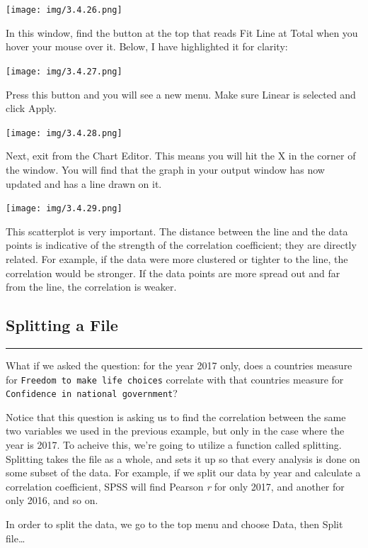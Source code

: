 \documentclass[]{book}
\begin{document}
\texttt{[image: img/3.4.26.png]}

In this window, find the button at the top that reads {Fit Line at
Total} when you hover your mouse over it. Below, I have highlighted it
for clarity:

\texttt{[image: img/3.4.27.png]}

Press this button and you will see a new menu. Make sure {Linear} is
selected and click {Apply}.

\texttt{[image: img/3.4.28.png]}

Next, exit from the Chart Editor. This means you will hit the {X} in the
corner of the window. You will find that the graph in your output window
has now updated and has a line drawn on it.

\texttt{[image: img/3.4.29.png]}

This scatterplot is very important. The distance between the line and
the data points is indicative of the strength of the correlation
coefficient; they are directly related. For example, if the data were
more clustered or tighter to the line, the correlation would be
stronger. If the data points are more spread out and far from the line,
the correlation is weaker.

\subsection{Splitting a File}\label{splitting-a-file}

\begin{center}\rule{0.5\linewidth}{0.5pt}\end{center}

What if we asked the question: for the year 2017 only, does a countries
measure for \texttt{Freedom\ to\ make\ life\ choices} correlate with
that countries measure for
\texttt{Confidence\ in\ national\ government}?

Notice that this question is asking us to find the correlation between
the same two variables we used in the previous example, but only in the
case where the year is 2017. To acheive this, we're going to utilize a
function called splitting. Splitting takes the file as a whole, and sets
it up so that every analysis is done on some subset of the data. For
example, if we split our data by year and calculate a correlation
coefficient, SPSS will find Pearson \emph{r} for only 2017, and another
for only 2016, and so on.

In order to split the data, we go to the top menu and choose {Data},
then {Split file\ldots{}}
\end{document}
